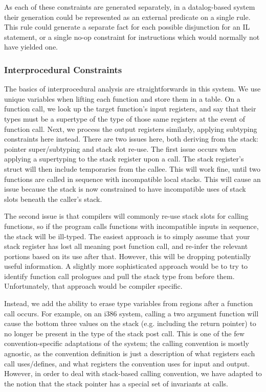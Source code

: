 As each of these constraints are generated separately, in a datalog-based system their generation could be represented as an external predicate on a single rule.
This rule could generate a separate fact for each possible disjunction for an IL statement, or a single no-op constraint for instructions which would normally not have yielded one.

\subsubsection{Interprocedural Constraints}
The basics of interprocedural analysis are straightforwards in this system. We use unique variables when lifting each function and store them in a table. On a function call, we look up the target function's input registers, and say that their types must be a supertype of the type of those same registers at the event of function call. Next, we process the output registers similarly, applying subtyping constraints here instead. There are two issues here, both deriving from the stack: pointer super/subtyping and stack slot re-use. The first issue occurs when applying a supertyping to the stack register upon a call. The stack register's struct will then include temporaries from the callee. This will work fine, until two functions are called in sequence with incompatible local stacks. This will cause an issue because the stack is now constrained to have incompatible uses of stack slots beneath the caller's stack.

The second issue is that compilers will commonly re-use stack slots for calling functions, so if the program calls functions with incompatible inputs in sequence, the stack will be ill-typed. The easiest approach is to simply assume that your stack register has lost all meaning post function call, and re-infer the relevant portions based on its use after that. However, this will be dropping potentially useful information. A slightly more sophisticated approach would be to try to identify function call prologues and pull the stack type from before them. Unfortunately, that approach would be compiler specific.

Instead, we add the ability to erase type variables from regions after a function call occurs. For example, on an i386 system, calling a two argument function will cause the bottom three values on the stack (e.g. including the return pointer) to no longer be present in the type of the stack post call. This is one of the few convention-specific adaptations of the system; the calling convention is mostly agnostic, as the convention definition is just a description of what registers each call uses/defines, and what registers the convention uses for input and output. However, in order to deal with stack-based calling convention, we have adapted to the notion that the stack pointer has a special set of invariants at calls.

